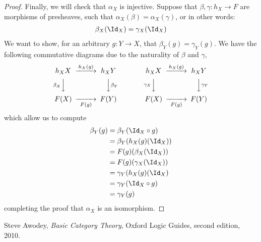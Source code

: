 \documentclass[11pt]{article}
\theoremstyle{plain}
\theoremstyle{definition}
\begin{document}
\begin{proof}
    Finally, we will check that $\alpha_X$ is injective. Suppose that $\beta, \gamma : h_X \to F$ are morphisms of presheaves, such that $\alpha_X(\beta) = \alpha_X(\gamma)$, or in other words:
    \begin{align*}
        \beta_X(\Id_X) = \gamma_X(\Id_X)
    \end{align*}
    We want to show, for an arbitrary $g : Y \to X$, that $\beta_Y(g) = \gamma_Y(g)$. We have the following commutative diagrams due to the naturality of $\beta$ and $\gamma$,
    \[
    \begin{CD}
        h_XX @>h_X(g)>> h_XY  \\
        @V\beta_X VV @VV\beta_Y V \\
        F(X) @>>F(g)> F(Y)
    \end{CD} \qquad \qquad
    \begin{CD}
        h_XX @>h_X(g)>> h_XY \\
        @V\gamma_X VV @VV\gamma_Y V \\
        F(X) @>>F(g)> F(Y)
    \end{CD}
    \]
    which allow us to compute
    \begin{align*}
        \beta_Y(g) &= \beta_Y(\Id_X \circ g) \\
        &= \beta_Y(h_X(g)(\Id_X)) \\
        &= F(g)(\beta_X(\Id_X)) \\
        &= F(g)(\gamma_X(\Id_X)) \\
        &= \gamma_Y(h_X(g)(\Id_X) \\
        &= \gamma_Y(\Id_X \circ g) \\
        &= \gamma_Y(g)
    \end{align*}
    completing the proof that $\alpha_X$ is an isomorphism.
\end{proof}

\begin{thebibliography}{9}
        Steve Awodey,
        \emph{Basic Category Theory},
        Oxford Logic Guides,
        second edition,
        2010.
\end{thebibliography}
\end{document}
